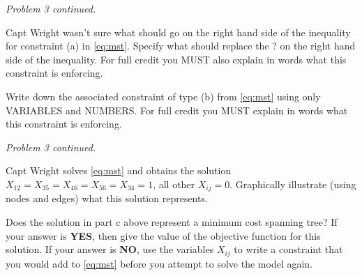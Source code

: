 \newpage
\noindent \emph{Problem 3 continued.}

\begin{parts}
  
 Capt Wright wasn't sure what should go on the right hand side of the inequality for constraint (a) in \eqref{eq:mst}.  Specify what should replace the ? on the right hand side of the inequality.  For full credit you MUST also explain in words what this constraint is enforcing. 

\vfill


 Write down the associated constraint of type (b) from \eqref{eq:mst} using only VARIABLES and NUMBERS.  For full credit you MUST explain in words what this constraint is enforcing.

\vfill

\newpage
\noindent \emph{Problem 3 continued.}


 Capt Wright solves \eqref{eq:mst} and obtains the solution $X_{12} = X_{35} = X_{46} = X_{56} = X_{34} = 1$, all other $X_{ij} = 0$.  Graphically illustrate (using nodes and edges) what this solution represents. 

\vspace{2cm}
\vfill

 Does the solution in part c above represent a minimum cost spanning tree?  If your answer is \mbox{\bf{YES}}, then give the value of the objective function for this solution.  If your answer is \mbox{\bf{NO}}, use the variables $X_{ij}$ to write a constraint that you would add to \eqref{eq:mst} before you attempt to solve the model again.


\vfill



\end{parts}



